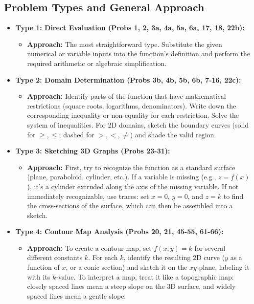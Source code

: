 \documentclass{article}
\begin{document}
\subsection{Problem Types and General Approach}
\begin{itemize}
    \item \textbf{Type 1: Direct Evaluation (Probs 1, 2, 3a, 4a, 5a, 6a, 17, 18, 22b):}
    \begin{itemize}
        \item \textbf{Approach:} The most straightforward type. Substitute the given numerical or variable inputs into the function's definition and perform the required arithmetic or algebraic simplification.
    \end{itemize}
    
    \item \textbf{Type 2: Domain Determination (Probs 3b, 4b, 5b, 6b, 7-16, 22c):}
    \begin{itemize}
        \item \textbf{Approach:} Identify parts of the function that have mathematical restrictions (square roots, logarithms, denominators). Write down the corresponding inequality or non-equality for each restriction. Solve the system of inequalities. For 2D domains, sketch the boundary curves (solid for $\ge, \le$; dashed for $>, <, \neq$) and shade the valid region.
    \end{itemize}
    
    \item \textbf{Type 3: Sketching 3D Graphs (Probs 23-31):}
    \begin{itemize}
        \item \textbf{Approach:} First, try to recognize the function as a standard surface (plane, paraboloid, cylinder, etc.). If a variable is missing (e.g., $z=f(x)$), it's a cylinder extruded along the axis of the missing variable. If not immediately recognizable, use traces: set $x=0$, $y=0$, and $z=k$ to find the cross-sections of the surface, which can then be assembled into a sketch.
    \end{itemize}
    
    \item \textbf{Type 4: Contour Map Analysis (Probs 20, 21, 45-55, 61-66):}
    \begin{itemize}
        \item \textbf{Approach:} To create a contour map, set $f(x, y) = k$ for several different constants $k$. For each $k$, identify the resulting 2D curve ($y$ as a function of $x$, or a conic section) and sketch it on the $xy$-plane, labeling it with its $k$-value. To interpret a map, treat it like a topographic map: closely spaced lines mean a steep slope on the 3D surface, and widely spaced lines mean a gentle slope.
    \end{itemize}
    

\end{itemize}
\end{document}
